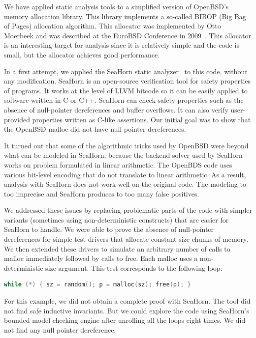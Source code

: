 \documentclass[twoside,12pt]{cslreport}
\begin{document}
We have applied static analysis tools to a simplified version of
OpenBSD's memory allocation library. This library implements a
so-called BIBOP (Big Bag of Pages) allocation algorithm. This
allocator was implemented by Otto Moerbeek and was described at the
EuroBSD Conference in 2009~\cite{Moerbeek2009}. This allocator is an
interesting target for analysis since it is relatively simple and the
code is small, but the allocator achieves good performance.

In a first attempt, we applied the SeaHorn static
analyzer~\cite{Gurfinkel+etal:SeaHorn:2015} to this code, without any
modification. SeaHorn is an open-source verification tool for safety
properties of programs. It works at the level of LLVM bitcode so it
can be easily applied to software written in C or C++. SeaHorn can
check safety properties such as the absence of null-pointer
dereferences and buffer overflows. It can also verify user-provided
properties written as C-like assertions. Our initial goal was to show
that the OpenBSD malloc did not have null-pointer dereferences.

It turned out that some of the algorithmic tricks used by OpenBSD were
beyond what can be modeled in SeaHorn, because the backend solver used
by SeaHorn works on problem formulated in linear arithmetic. The
OpenBDS code uses various bit-level encoding that do not translate to
linear arithmetic. As a result, analysis with SeaHorn does not work
well on the original code. The modeling to too imprecise and SeaHorn
produces to too many false positives.

We addressed these issues by replacing problematic parts of the code
with simpler variants (sometimes using non-deterministic constructs)
that are easier for SeaHorn to handle. We were able to prove the
absence of null-pointer dereferences for simple test drivers that
allocate constant-size chunks of memory. We then extended these
drivers to simulate an arbitrary number of calls to malloc immediately
followed by calls to free. Each malloc uses a non-deterministic size
argument. This test corresponds to the following loop:
\begin{lstlisting}[language=C]
    while (*) { sz = random(); p = malloc(sz); free(p); }
\end{lstlisting}
For this example, we did not obtain a complete proof with SeaHorn. The
tool did not find safe inductive invariants. But we could explore the
code using SeaHorn's bounded model checking engine after unrolling all
the loops eight times. We did not find any null pointer dereference.
\end{document}

